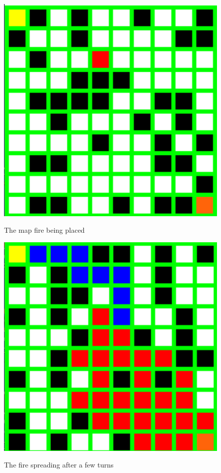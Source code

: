 \documentclass[11pt]{scrartcl} %
\begin{document}
\begin{figure}[H]
 	\begin{center}
 	\includegraphics*[scale=0.3]{GUI6C.png}
	\caption{The map fire being placed}
	\label{fig:example}
	\vspace{2em}
	\includegraphics*[scale=0.3]{GUI7C.png}
	\caption{The fire spreading after a few turns}
	\label{fig:example}
	
 	\end{center}
  	
	
 \end{figure}
\end{document}

